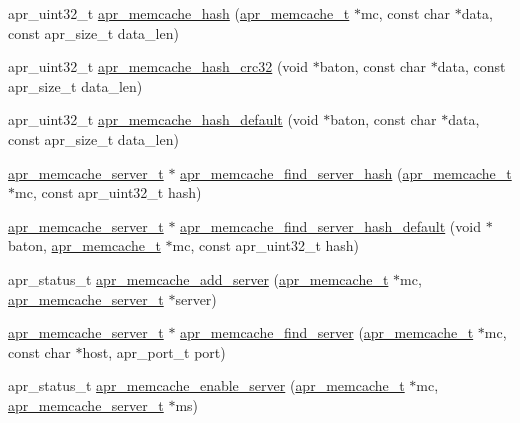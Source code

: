 \begin{DoxyCompactItemize}
\item 
apr\-\_\-uint32\-\_\-t \hyperlink{group___a_p_r___util___m_c_ga945a83f7f56800b18243ec5933c16593}{apr\-\_\-memcache\-\_\-hash} (\hyperlink{structapr__memcache__t}{apr\-\_\-memcache\-\_\-t} $\ast$mc, const char $\ast$data, const apr\-\_\-size\-\_\-t data\-\_\-len)
\item 
apr\-\_\-uint32\-\_\-t \hyperlink{group___a_p_r___util___m_c_ga103ab58d59ca8e4668d31631ee0d3222}{apr\-\_\-memcache\-\_\-hash\-\_\-crc32} (void $\ast$baton, const char $\ast$data, const apr\-\_\-size\-\_\-t data\-\_\-len)
\item 
apr\-\_\-uint32\-\_\-t \hyperlink{group___a_p_r___util___m_c_ga6e2fa2e270332d2cdb44abf775f8022e}{apr\-\_\-memcache\-\_\-hash\-\_\-default} (void $\ast$baton, const char $\ast$data, const apr\-\_\-size\-\_\-t data\-\_\-len)
\item 
\hyperlink{structapr__memcache__server__t}{apr\-\_\-memcache\-\_\-server\-\_\-t} $\ast$ \hyperlink{group___a_p_r___util___m_c_ga22fe48405f08eaded915f5205d9fc221}{apr\-\_\-memcache\-\_\-find\-\_\-server\-\_\-hash} (\hyperlink{structapr__memcache__t}{apr\-\_\-memcache\-\_\-t} $\ast$mc, const apr\-\_\-uint32\-\_\-t hash)
\item 
\hyperlink{structapr__memcache__server__t}{apr\-\_\-memcache\-\_\-server\-\_\-t} $\ast$ \hyperlink{group___a_p_r___util___m_c_ga0c1f483d299b083e0c06e9ec1c9eb316}{apr\-\_\-memcache\-\_\-find\-\_\-server\-\_\-hash\-\_\-default} (void $\ast$baton, \hyperlink{structapr__memcache__t}{apr\-\_\-memcache\-\_\-t} $\ast$mc, const apr\-\_\-uint32\-\_\-t hash)
\item 
apr\-\_\-status\-\_\-t \hyperlink{group___a_p_r___util___m_c_ga9d6381d9d9f8f83f4fa5450cc8066590}{apr\-\_\-memcache\-\_\-add\-\_\-server} (\hyperlink{structapr__memcache__t}{apr\-\_\-memcache\-\_\-t} $\ast$mc, \hyperlink{structapr__memcache__server__t}{apr\-\_\-memcache\-\_\-server\-\_\-t} $\ast$server)
\item 
\hyperlink{structapr__memcache__server__t}{apr\-\_\-memcache\-\_\-server\-\_\-t} $\ast$ \hyperlink{group___a_p_r___util___m_c_ga76b77e042ced1bae3b23f71696482a7e}{apr\-\_\-memcache\-\_\-find\-\_\-server} (\hyperlink{structapr__memcache__t}{apr\-\_\-memcache\-\_\-t} $\ast$mc, const char $\ast$host, apr\-\_\-port\-\_\-t port)
\item 
apr\-\_\-status\-\_\-t \hyperlink{group___a_p_r___util___m_c_gafe4824659cbe261409b57a48d85c34e3}{apr\-\_\-memcache\-\_\-enable\-\_\-server} (\hyperlink{structapr__memcache__t}{apr\-\_\-memcache\-\_\-t} $\ast$mc, \hyperlink{structapr__memcache__server__t}{apr\-\_\-memcache\-\_\-server\-\_\-t} $\ast$ms)

\end{DoxyCompactItemize}
